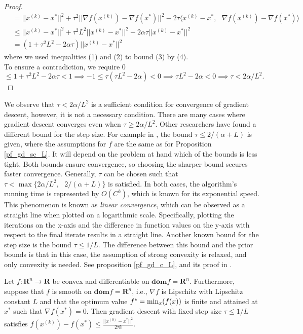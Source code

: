 \begin{proof}
\begin{align}
    &= ||x^{(k)}-x^{*}||^{2} + \tau^{2}||\nabla f(x^{(k)})-\nabla f(x^{*})||^{2} - 2\tau \langle x^{(k)}-x^{*},\text{ } \nabla f(x^{(k)})-\nabla f(x^{*})\rangle\\
    &\leq ||x^{(k)}-x^{*}||^{2} + \tau^{2}L^{2}||x^{(k)}-x^{*}||^{2} - 2\alpha \tau||x^{(k)}-x^{*}||^{2}\nonumber\\
    &= \left(1+\tau^{2}L^{2}-2\alpha \tau \right)||x^{(k)}-x^{*}||^{2}
\end{align}
where we used inequalities (1) and (2) to bound (3) by (4).\\ To ensure a contradiction, we require 0 $\leq 1+\tau^{2}L^{2}-2\alpha \tau < 1 \implies -1 \leq \tau\left(\tau L^{2}-2\alpha \right) < 0 \implies \tau L^{2}-2\alpha < 0 \implies \tau < 2\alpha/L^{2}.$ 
\end{proof}
We observe that $\tau < 2\alpha / L^{2}$ is a sufficient condition for convergence of gradient descent, however, it is not a necessary condition. There are many cases where gradient descent converges even when $\tau \geq 2\alpha / L^{2}$. Other researchers have found a different bound for the step size. For example in \cite[10]{GDandLS}, the bound $\tau \leq 2/(\alpha+L)$ is given, where the assumptions for $f$ are the same as for Proposition \ref{pf_gd_sc_L}. It will depend on the problem at hand which of the bounds is less tight. Both bounds ensure convergence, so choosing the sharper bound secures faster convergence. Generally, $\tau$ can be chosen such that $\tau < \max\{2\alpha / L^{2},\text{ } 2/(\alpha+L)\}$ is satisfied. In both cases, the algorithm's running time is represented by $O(C^{k})$, which is known for its exponential speed. This phenomenon is known as \textit{linear convergence}, which can be observed as a straight line when plotted on a logarithmic scale. Specifically, plotting the iterations on the x-axis and the difference in function values on the y-axis with respect to the final iterate results in a straight line. Another known bound for the step size is the bound $\tau \leq 1/L.$ The difference between this bound and the prior bounds is that in this case, the assumption of strong convexity is relaxed, and only convexity is needed. See proposition \ref{pf_gd_c_L}, and its proof in \cite[9]{GDandLS}.
\begin{proposition}\label{pf_gd_c_L}
\textnormal{\cite[9]{GDandLS}}
Let $f: \mathbf{R}^{n}\longrightarrow \mathbf{R}$ be convex and differentiable on $\textbf{dom}f = \mathbf{R}^{n}.$ Furthermore, suppose that $f$ is smooth on $\textbf{dom}f = \mathbf{R}^{n}$, i.e., $\nabla f$ is Lipschitz with Lipschitz constant $L$ and that the optimum value $f^{*} = \textnormal{min}_{x}(f(x))$ is finite and attained at $x^{*}$ such that $\nabla f(x^{*})=0.$ Then gradient descent with fixed step size $\tau \leq 1/L$ satisfies $f(x^{(k)})-f(x^{*}) \leq \frac{||x^{(0)}-x^{*}||^{2}}{2\tau k}.$ 
\end{proposition}
